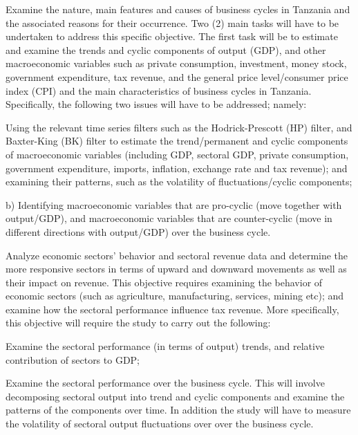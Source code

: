 \documentclass[12pt,a4paper,final]{article}
\begin{document}
\begin{compactenum}[1)]
\item Examine the nature, main features and causes of business cycles in Tanzania and the associated reasons for their occurrence. Two (2) main tasks will have to be undertaken to address this specific objective. The first task will be to estimate and examine the trends and cyclic components of output (GDP), and other macroeconomic variables such as private consumption, investment, money stock, government expenditure, tax revenue, and the general price level/consumer price index (CPI) and the main characteristics of business cycles in Tanzania.  Specifically, the following two issues will have to be addressed; namely:
\begin{compactenum}[(i)]

\item	Using the relevant time series filters such as the Hodrick-Prescott (HP) filter, and Baxter-King (BK) filter to estimate the trend/permanent and cyclic components of macroeconomic variables (including GDP, sectoral GDP, private consumption, government expenditure, imports, inflation, exchange rate and tax revenue); and examining their patterns, such as the volatility of fluctuations/cyclic components;

\item b)	Identifying macroeconomic variables that are pro-cyclic (move together with output/GDP), and macroeconomic variables that are counter-cyclic (move in different directions with output/GDP) over the business cycle.
\end{compactenum}  

\item	Analyze economic sectors' behavior and  sectoral revenue data and determine the more responsive sectors in terms of upward and downward movements as well as their impact on revenue. This objective requires examining the behavior of economic sectors (such as agriculture, manufacturing, services, mining etc); and examine how the sectoral performance influence tax revenue.  More specifically, this objective will require the study to carry out the following:

\begin{compactenum}[(i)]
\item	Examine the sectoral performance (in terms of output) trends, and relative contribution of sectors to GDP;

\item	Examine the sectoral performance over the business cycle.  This will involve decomposing sectoral output into trend and cyclic components and examine the patterns of the components over time.  In addition the study will have to measure the volatility of sectoral output fluctuations over over the business cycle. 


\end{compactenum}
\end{compactenum}
\end{document}
